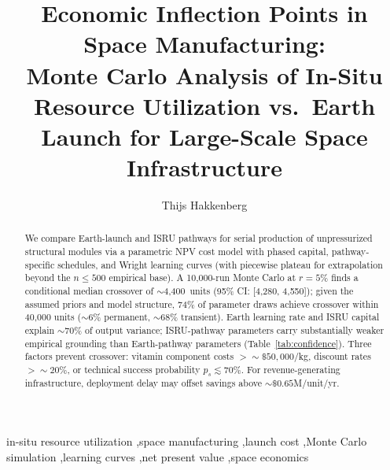 \documentclass[preprint,12pt]{elsarticle}
\begin{document}
\begin{frontmatter}

\title{Economic Inflection Points in Space Manufacturing:\\ Monte Carlo Analysis of In-Situ Resource Utilization vs.\ Earth Launch for Large-Scale Space Infrastructure}

\author[dyson]{Thijs Hakkenberg}

\address[dyson]{Project Dyson, Open Research Initiative}

\begin{abstract}
We compare Earth-launch and ISRU pathways for serial production of unpressurized structural modules via a parametric NPV cost model with phased capital, pathway-specific schedules, and Wright learning curves (with piecewise plateau for extrapolation beyond the $n \leq 500$ empirical base). A 10{,}000-run Monte Carlo at $r = 5\%$ finds a conditional median crossover of ${\sim}$4{,}400~units (95\% CI: [4{,}280, 4{,}550]); given the assumed priors and model structure, 74\% of parameter draws achieve crossover within 40{,}000 units (${\sim}$6\% permanent, ${\sim}$68\% transient). Earth learning rate and ISRU capital explain ${\sim}$70\% of output variance; ISRU-pathway parameters carry substantially weaker empirical grounding than Earth-pathway parameters (Table~\ref{tab:confidence}). Three factors prevent crossover: vitamin component costs $> {\sim}\$50{,}000$/kg, discount rates $> {\sim}20\%$, or technical success probability $p_s \lesssim 70\%$. For revenue-generating infrastructure, deployment delay may offset savings above ${\sim}\$0.65$M/unit/yr.
\end{abstract}

\begin{keyword}
in-situ resource utilization \sep space manufacturing \sep launch cost \sep Monte Carlo simulation \sep learning curves \sep net present value \sep space economics
\end{keyword}

\end{frontmatter}
\end{document}
